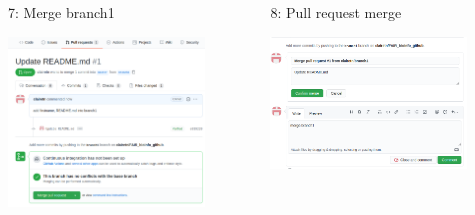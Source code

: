 \begin{frame}{ }
\begin{columns}
\begin{column}{0.48\textwidth}
\begin{exampleblock}{7: Merge branch1}
    \begin{center}
    \includegraphics[height=4.5cm]{05_history/Images/FAIR_github_PullRequestBranch1.png}
    \end{center}
\end{exampleblock}
\end{column}
\begin{column}{0.48\textwidth}
\begin{exampleblock}{8: Pull request merge}
    \begin{center}
    \includegraphics[height=3.5cm]{05_history/Images/FAIR_github_MergeBranch1.png}
    \end{center}
\end{exampleblock}
\end{column}
\end{columns}
\end{frame}
